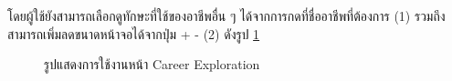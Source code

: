 โดยผู้ใช้ยังสามารถเลือกดูทักษะที่ใช้ของอาชีพอื่น ๆ ได้จากการกดที่ชื่ออาชีพที่ต้องการ (1) รวมถึงสามารถเพิ่มลดขนาดหน้าจอได้จากปุ่ม + - (2) ดังรูป \ref{fig:home-CE}
\begin{figure}[H]\centering
    \caption{รูปแสดงการใช้งานหน้า Career Exploration}\label{fig:home-CE}
\end{figure}
